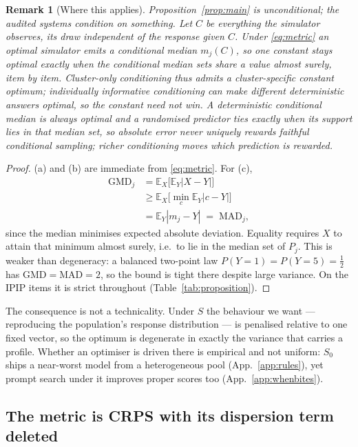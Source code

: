 \documentclass[11pt]{article}
\newtheorem{remark}{Remark}
\begin{document}
\begin{remark}[Where this applies]
\label{rem:conditional}
Proposition~\ref{prop:main} is unconditional; the audited systems condition on
something. Let $C$ be everything the simulator observes, its draw independent of
the response given $C$. Under \eqref{eq:metric} an optimal simulator emits a
\emph{conditional} median $m_j(C)$, so one constant stays optimal exactly when
the conditional median sets share a value almost surely, item by item.
Cluster-only conditioning thus admits a cluster-specific constant optimum;
individually informative conditioning can make different deterministic answers
optimal, so the constant need not win. A deterministic conditional median is
always optimal and a randomised predictor ties exactly when its support lies in
that median set, so absolute error never \emph{uniquely} rewards faithful
conditional sampling; richer conditioning moves which prediction is rewarded.
\end{remark}

\begin{proof}
(a) and (b) are immediate from \eqref{eq:metric}. For (c),
\begin{align*}
\mathrm{GMD}_j &= \mathbb{E}_X\big[\mathbb{E}_Y|X-Y|\big]\\
&\ge \mathbb{E}_X\big[\textstyle\min_{c}\mathbb{E}_Y|c-Y|\big]\\
&= \mathbb{E}_Y|m_j-Y| \;=\; \mathrm{MAD}_j,
\end{align*}
since the median minimises expected absolute deviation. Equality requires $X$
to attain that minimum almost surely, i.e.\ to lie in the median set of $P_j$.
This is weaker than degeneracy: a balanced two-point law
$P(Y{=}1)=P(Y{=}5)=\tfrac12$ has $\mathrm{GMD}=\mathrm{MAD}=2$, so the bound is
tight there despite large variance. On the IPIP items it is strict throughout
(Table~\ref{tab:proposition}).
\end{proof}

The consequence is not a technicality. Under $S$ the behaviour we want ---
reproducing the population's response distribution --- is penalised relative to
one fixed vector, so the optimum is degenerate in exactly the variance that
carries a profile. Whether an optimiser is driven there is empirical and not
uniform: $S_0$ ships a near-worst model from a heterogeneous pool
(App.~\ref{app:rules}), yet prompt search under it improves proper scores too
(App.~\ref{app:whenbites}).

\subsection{The metric is CRPS with its dispersion term deleted}
\label{sec:crps}
\end{document}
